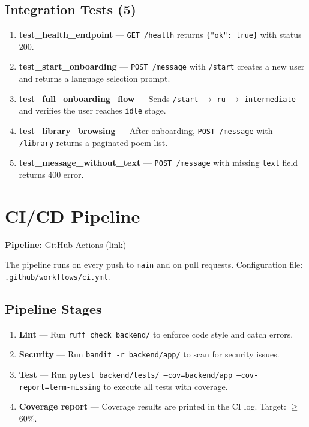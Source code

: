 \documentclass[11pt, a4paper]{article}
\begin{document}
\subsection*{Integration Tests (5)}

\begin{enumerate}
    \item \textbf{test\_health\_endpoint} --- \texttt{GET /health} returns \texttt{\{"ok": true\}} with status 200.
    \item \textbf{test\_start\_onboarding} --- \texttt{POST /message} with \texttt{/start} creates a new user and returns a language selection prompt.
    \item \textbf{test\_full\_onboarding\_flow} --- Sends \texttt{/start} $\rightarrow$ \texttt{ru} $\rightarrow$ \texttt{intermediate} and verifies the user reaches \texttt{idle} stage.
    \item \textbf{test\_library\_browsing} --- After onboarding, \texttt{POST /message} with \texttt{/library} returns a paginated poem list.
    \item \textbf{test\_message\_without\_text} --- \texttt{POST /message} with missing \texttt{text} field returns 400 error.
\end{enumerate}


\section{CI/CD Pipeline}

\textbf{Pipeline:} \href{https://github.com/d13-l1t3/PoetryForYou/actions}{GitHub Actions (link)}

The pipeline runs on every push to \texttt{main} and on pull requests. Configuration file: \texttt{.github/workflows/ci.yml}.

\subsection*{Pipeline Stages}

\begin{enumerate}
    \item \textbf{Lint} --- Run \texttt{ruff check backend/} to enforce code style and catch errors.
    \item \textbf{Security} --- Run \texttt{bandit -r backend/app/} to scan for security issues.
    \item \textbf{Test} --- Run \texttt{pytest backend/tests/ --cov=backend/app --cov-report=term-missing} to execute all tests with coverage.
    \item \textbf{Coverage report} --- Coverage results are printed in the CI log. Target: $\geq$60\%.
\end{enumerate}
\end{document}
